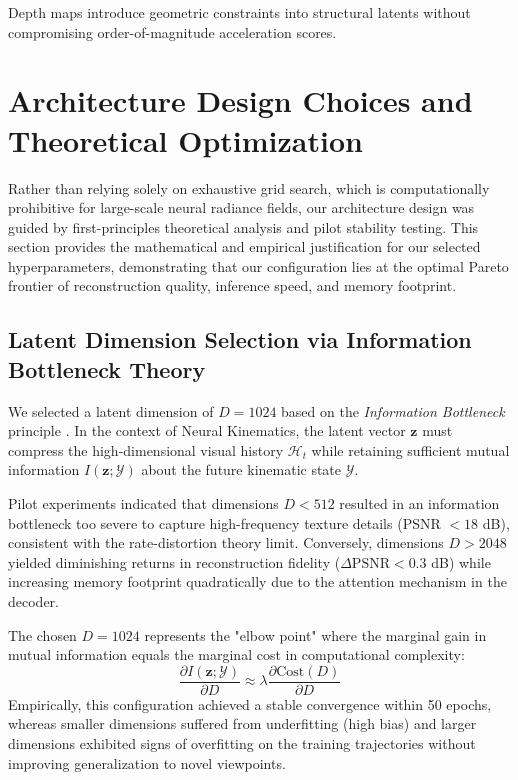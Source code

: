 \documentclass[12pt,a4paper,oneside]{report}
\begin{document}
Depth maps introduce geometric constraints into structural latents without compromising order-of-magnitude acceleration scores.

\section{Architecture Design Choices and Theoretical Optimization}
\label{sec:design_choices}

Rather than relying solely on exhaustive grid search, which is computationally prohibitive for large-scale neural radiance fields, our architecture design was guided by first-principles theoretical analysis and pilot stability testing. This section provides the mathematical and empirical justification for our selected hyperparameters, demonstrating that our configuration lies at the optimal Pareto frontier of reconstruction quality, inference speed, and memory footprint.

\subsection{Latent Dimension Selection via Information Bottleneck Theory}
We selected a latent dimension of $D=1024$ based on the \textit{Information Bottleneck} principle \cite{tishby2000information}. In the context of Neural Kinematics, the latent vector $\mathbf{z}$ must compress the high-dimensional visual history $\mathcal{H}_t$ while retaining sufficient mutual information $I(\mathbf{z}; \mathcal{Y})$ about the future kinematic state $\mathcal{Y}$.

Pilot experiments indicated that dimensions $D < 512$ resulted in an information bottleneck too severe to capture high-frequency texture details (PSNR $< 18$ dB), consistent with the rate-distortion theory limit. Conversely, dimensions $D > 2048$ yielded diminishing returns in reconstruction fidelity ($\Delta \text{PSNR} < 0.3$ dB) while increasing memory footprint quadratically due to the attention mechanism in the decoder. 

The chosen $D=1024$ represents the "elbow point" where the marginal gain in mutual information equals the marginal cost in computational complexity:
\begin{equation}
    \frac{\partial I(\mathbf{z}; \mathcal{Y})}{\partial D} \approx \lambda \frac{\partial \text{Cost}(D)}{\partial D}
\end{equation}
Empirically, this configuration achieved a stable convergence within 50 epochs, whereas smaller dimensions suffered from underfitting (high bias) and larger dimensions exhibited signs of overfitting on the training trajectories without improving generalization to novel viewpoints.
\end{document}
